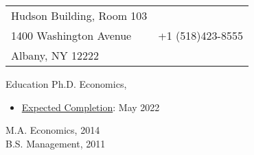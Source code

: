 \documentclass{resume_liang} %
\begin{document}
	
\begin{tabu} to \linewidth {X[l]X[r]}
Hudson Building, Room 103  & \href{mailto:lfu@albany.edu}{\color{blue}{lfu@albany.edu}} \\
1400 Washington Avenue     & +1 (518)423-8555 \\
Albany, NY 12222           & \href{https://liang-fu-econ.github.io/website/}{\color{blue}{https://liang-fu-econ.github.io/website/}}
\end{tabu}
\bigskip




\begin{rSection}{Education}
Ph.D. Economics, {\bf \href{https://www.albany.edu/economics}{\color{black}{University at Albany, SUNY}}}  \hfill {} \vspace{0.1cm}              
  \begin{itemize}
  	\item[] \underline{Expected Completion}: May 2022
  \end{itemize}
M.A. Economics, {\bf \href{http://en.cufe.edu.cn/}{\color{black}{Central University of Finance and Economics}}} \hfill {2014} 
\vspace{0.1cm} \\
B.S. Management, {\bf \href{https://english.qdu.edu.cn/}{\color{black}{Qingdao University}}} \hfill {2011} 
\vspace{0.1cm} 
\end{rSection}
\bigskip  
\end{document}
